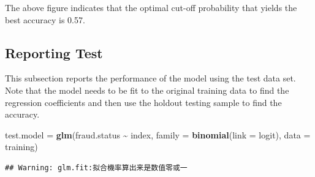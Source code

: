 \documentclass[
]{book}
\newenvironment{Shaded}{\begin{snugshade}}{\end{snugshade}}
\newcommand{\AttributeTok}[1]{\textcolor[rgb]{0.13,0.29,0.53}{#1}}
\newcommand{\FloatTok}[1]{\textcolor[rgb]{0.00,0.00,0.81}{#1}}
\newcommand{\FunctionTok}[1]{\textcolor[rgb]{0.13,0.29,0.53}{\textbf{#1}}}
\newcommand{\NormalTok}[1]{#1}
\newcommand{\OtherTok}[1]{\textcolor[rgb]{0.56,0.35,0.01}{#1}}
\newcommand{\SpecialCharTok}[1]{\textcolor[rgb]{0.81,0.36,0.00}{\textbf{#1}}}
\newcommand{\StringTok}[1]{\textcolor[rgb]{0.31,0.60,0.02}{#1}}
\begin{document}
The above figure indicates that the optimal cut-off probability that yields the best accuracy is 0.57.

\hypertarget{reporting-test}{%
\subsection{Reporting Test}\label{reporting-test}}

This subsection reports the performance of the model using the test data set. Note that the model needs to be fit to the original training data to find the regression coefficients and then use the holdout testing sample to find the accuracy.

\begin{Shaded}
\begin{Highlighting}[]
\NormalTok{test.model }\OtherTok{=} \FunctionTok{glm}\NormalTok{(fraud.status }\SpecialCharTok{\textasciitilde{}}\NormalTok{ index, }\AttributeTok{family =} \FunctionTok{binomial}\NormalTok{(}\AttributeTok{link =}\NormalTok{ logit), }\AttributeTok{data =}\NormalTok{ training)}
\end{Highlighting}
\end{Shaded}

\begin{verbatim}
## Warning: glm.fit:拟合機率算出来是数值零或一
\end{verbatim}

\begin{Shaded}
\end{Shaded}
\end{document}
